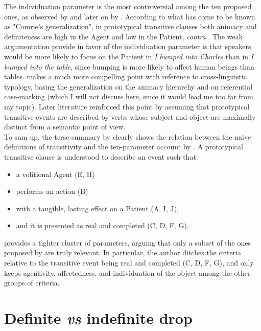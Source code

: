 The individuation parameter is the most controversial among the ten proposed ones, as observed by \textcite[128]{comrie1989language} and later on by \textcite[18]{Naess2007}. According to what has come to be known as "Comrie's generalization", in prototypical transitive clauses both animacy and definiteness are high in the Agent and low in the Patient, \textit{contra} \textcite{HopperThompson1980}. The weak argumentation \textcite{HopperThompson1980} provide in favor of the individuation parameter is that speakers would be more likely to focus on the Patient in \textit{I bumped into Charles} than in \textit{I bumped into the table}, since bumping is more likely to affect human beings than tables. \textcite{comrie1989language} makes a much more compelling point with reference to cross-linguistic typology, basing the generalization on the animacy hierarchy and on referential case-marking (which I will not discuss here, since it would lead me too far from my topic). Later literature \parencite{Naess2007, kemmer1993middle, Kardos2010, Naess2009} reinforced this point by assuming that prototypical transitive events are described by verbs whose subject and object are maximally distinct from a semantic point of view.\\
To sum up, the terse summary by \textcite[15]{Naess2007} clearly shows the relation between the naive definitions of transitivity and the ten-parameter account by \textcite{HopperThompson1980}. A prototypical transitive clause is understood to describe an event such that:
\begin{itemize}
    \item a volitional Agent (E, H)
    \item performs an action (B)
    \item with a tangible, lasting effect on a Patient (A, I, J),
    \item and it is presented as real and completed (C, D, F, G).
\end{itemize}

\textcite[78]{Lorenzetti2008} provides a tighter cluster of parameters, arguing that only a subset of the ones proposed by \textcite{HopperThompson1980} are truly relevant. In particular, the author ditches the criteria relative to the transitive event being real and completed (C, D, F, G), and only keeps agentivity, affectedness, and individuation of the object among the other groups of criteria.


\section{Definite \textit{vs} indefinite drop} 

